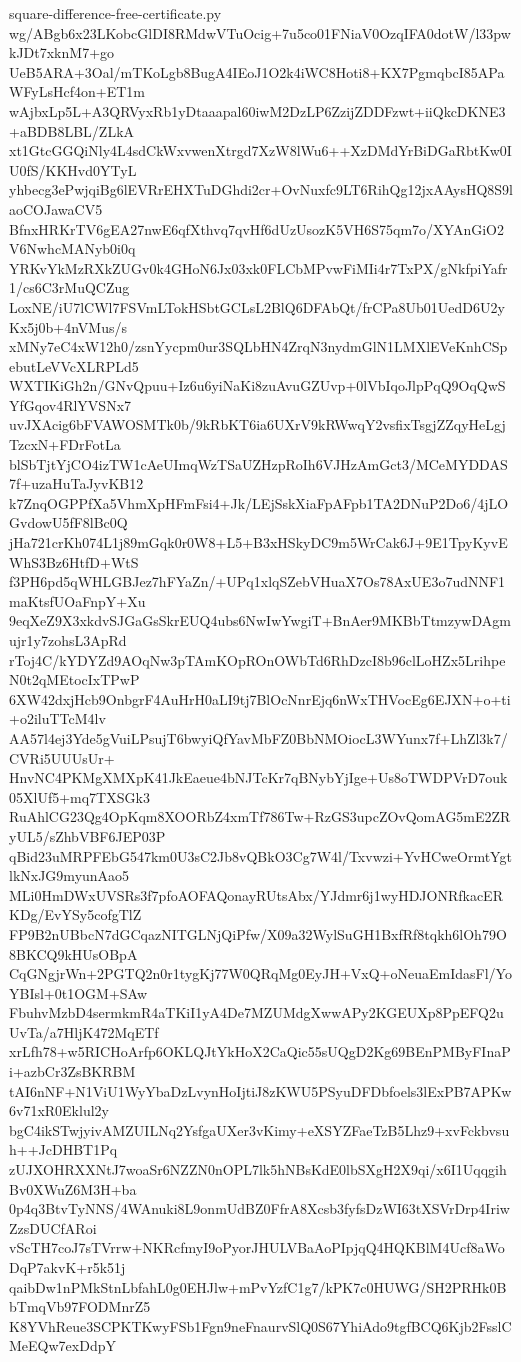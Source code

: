 \documentclass[11pt]{article}
\theoremstyle{definition}
\theoremstyle{remark}
\begin{document}
\begin{filecontents*}[overwrite]{square-difference-free-certificate.py}
wg/ABgb6x23LKobcGlDI8RMdwVTuOcig+7u5co01FNiaV0OzqIFA0dotW/l33pwkJDt7xknM7+go
UeB5ARA+3Oal/mTKoLgb8BugA4IEoJ1O2k4iWC8Hoti8+KX7PgmqbcI85APaWFyLsHcf4on+ET1m
wAjbxLp5L+A3QRVyxRb1yDtaaapal60iwM2DzLP6ZzijZDDFzwt+iiQkcDKNE3+aBDB8LBL/ZLkA
xt1GtcGGQiNly4L4sdCkWxvwenXtrgd7XzW8lWu6++XzDMdYrBiDGaRbtKw0IU0fS/KKHvd0YTyL
yhbecg3ePwjqiBg6lEVRrEHXTuDGhdi2cr+OvNuxfc9LT6RihQg12jxAAysHQ8S9laoCOJawaCV5
BfnxHRKrTV6gEA27nwE6qfXthvq7qvHf6dUzUsozK5VH6S75qm7o/XYAnGiO2V6NwhcMANyb0i0q
YRKvYkMzRXkZUGv0k4GHoN6Jx03xk0FLCbMPvwFiMIi4r7TxPX/gNkfpiYafr1/cs6C3rMuQCZug
LoxNE/iU7lCWl7FSVmLTokHSbtGCLsL2BlQ6DFAbQt/frCPa8Ub01UedD6U2yKx5j0b+4nVMus/s
xMNy7eC4xW12h0/zsnYycpm0ur3SQLbHN4ZrqN3nydmGlN1LMXlEVeKnhCSpebutLeVVcXLRPLd5
WXTIKiGh2n/GNvQpuu+Iz6u6yiNaKi8zuAvuGZUvp+0lVbIqoJlpPqQ9OqQwSYfGqov4RlYVSNx7
uvJXAcig6bFVAWOSMTk0b/9kRbKT6ia6UXrV9kRWwqY2vsfixTsgjZZqyHeLgjTzcxN+FDrFotLa
blSbTjtYjCO4izTW1cAeUImqWzTSaUZHzpRoIh6VJHzAmGct3/MCeMYDDAS7f+uzaHuTaJyvKB12
k7ZnqOGPPfXa5VhmXpHFmFsi4+Jk/LEjSskXiaFpAFpb1TA2DNuP2Do6/4jLOGvdowU5fF8lBc0Q
jHa721crKh074L1j89mGqk0r0W8+L5+B3xHSkyDC9m5WrCak6J+9E1TpyKyvEWhS3Bz6HtfD+WtS
f3PH6pd5qWHLGBJez7hFYaZn/+UPq1xlqSZebVHuaX7Os78AxUE3o7udNNF1maKtsfUOaFnpY+Xu
9eqXeZ9X3xkdvSJGaGsSkrEUQ4ubs6NwIwYwgiT+BnAer9MKBbTtmzywDAgmujr1y7zohsL3ApRd
rToj4C/kYDYZd9AOqNw3pTAmKOpROnOWbTd6RhDzcI8b96clLoHZx5LrihpeN0t2qMEtocIxTPwP
6XW42dxjHcb9OnbgrF4AuHrH0aLI9tj7BlOcNnrEjq6nWxTHVocEg6EJXN+o+ti+o2iluTTcM4lv
AA57l4ej3Yde5gVuiLPsujT6bwyiQfYavMbFZ0BbNMOiocL3WYunx7f+LhZl3k7/CVRi5UUUsUr+
HnvNC4PKMgXMXpK41JkEaeue4bNJTcKr7qBNybYjIge+Us8oTWDPVrD7ouk05XlUf5+mq7TXSGk3
RuAhlCG23Qg4OpKqm8XOORbZ4xmTf786Tw+RzGS3upcZOvQomAG5mE2ZRyUL5/sZhbVBF6JEP03P
qBid23uMRPFEbG547km0U3sC2Jb8vQBkO3Cg7W4l/Txvwzi+YvHCweOrmtYgtlkNxJG9myunAao5
MLi0HmDWxUVSRs3f7pfoAOFAQonayRUtsAbx/YJdmr6j1wyHDJONRfkacERKDg/EvYSy5cofgTlZ
FP9B2nUBbcN7dGCqazNITGLNjQiPfw/X09a32WylSuGH1BxfRf8tqkh6lOh79O8BKCQ9kHUsOBpA
CqGNgjrWn+2PGTQ2n0r1tygKj77W0QRqMg0EyJH+VxQ+oNeuaEmIdasFl/YoYBIsl+0t1OGM+SAw
FbuhvMzbD4sermkmR4aTKiI1yA4De7MZUMdgXwwAPy2KGEUXp8PpEFQ2uUvTa/a7HljK472MqETf
xrLfh78+w5RICHoArfp6OKLQJtYkHoX2CaQic55sUQgD2Kg69BEnPMByFInaPi+azbCr3ZsBKRBM
tAI6nNF+N1ViU1WyYbaDzLvynHoIjtiJ8zKWU5PSyuDFDbfoels3lExPB7APKw6v71xR0Eklul2y
bgC4ikSTwjyivAMZUILNq2YsfgaUXer3vKimy+eXSYZFaeTzB5Lhz9+xvFckbvsuh++JcDHBT1Pq
zUJXOHRXXNtJ7woaSr6NZZN0nOPL7lk5hNBsKdE0lbSXgH2X9qi/x6I1UqqgihBv0XWuZ6M3H+ba
0p4q3BtvTyNNS/4WAnuki8L9onmUdBZ0FfrA8Xcsb3fyfsDzWI63tXSVrDrp4IriwZzsDUCfARoi
vScTH7coJ7sTVrrw+NKRcfmyI9oPyorJHULVBaAoPIpjqQ4HQKBlM4Ucf8aWoDqP7akvK+r5k51j
qaibDw1nPMkStnLbfahL0g0EHJlw+mPvYzfC1g7/kPK7c0HUWG/SH2PRHk0BbTmqVb97FODMnrZ5
K8YVhReue3SCPKTKwyFSb1Fgn9neFnaurvSlQ0S67YhiAdo9tgfBCQ6Kjb2FsslCMeEQw7exDdpY

\end{filecontents*}
\end{document}

